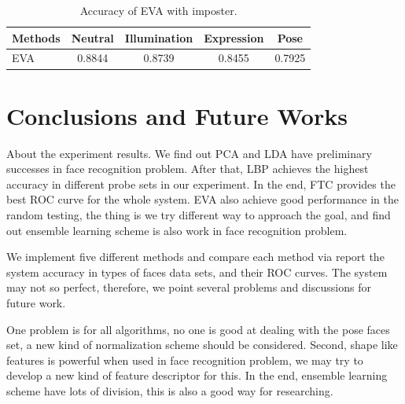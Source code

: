 \documentclass[10pt,twocolumn,letterpaper]{article}
\begin{document}
\begin{table}
    \begin{center}
        \begin{tabular}{|l|c|c|c|c|}
            \hline
            Methods & Neutral & Illumination & Expression & Pose\\
            \hline\hline
            EVA & 0.8844 & 0.8739 & 0.8455 & 0.7925 \\
            \hline
        \end{tabular}
    \end{center}
    \caption{Accuracy of EVA with imposter.}
    \label{tab:eva}
\end{table}



\section{Conclusions and Future Works}
About the experiment results. We find out PCA and LDA have preliminary successes
in face recognition problem. After that, LBP achieves the highest accuracy
in different probe sets in our experiment. 
In the end, FTC provides the best ROC curve for the whole system.
EVA also achieve good  performance in the random testing, the thing is we
try different way to approach the goal, and find out ensemble learning scheme
is also work in face recognition problem.

We implement five different methods and compare each method via report
the system accuracy in types of faces data sets, and their ROC curves.
The system may not so perfect, therefore, we point several problems and
discussions for future work.

One problem is for all algorithms, no one is good at dealing with the pose faces set,
a new kind of normalization scheme should be considered. Second, shape like features
is powerful when used in face recognition problem, we may try to develop a new kind
of feature descriptor for this. In the end, ensemble learning scheme have lots of
division, this is also a good way for researching.


{\small


}

\end{document}
